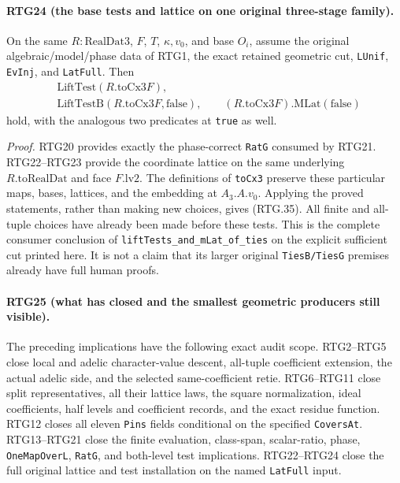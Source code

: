 \paragraph{RTG24 (the base tests and lattice on one original three-stage family).}
\label{claim:RTG24}
On the same $R:\mathrm{RealDat3}$, $F$, $T$, $\kappa,v_0$, and
base $O_i$, assume the original algebraic/model/phase data of RTG1,
the exact retained geometric cut, \texttt{LUnif}, \texttt{EvInj}, and
\texttt{LatFull}.  Then
\[
 \begin{split}
 &\mathrm{LiftTest}(R.\mathrm{toCx3}F),\\
 &\mathrm{LiftTestB}(R.\mathrm{toCx3}F,\mathrm{false}),\qquad
   (R.\mathrm{toCx3}F).\mathrm{MLat}(\mathrm{false})
 \end{split}                                                  \tag{RTG.35}
\]
hold, with the analogous two predicates at \texttt{true} as well.

\emph{Proof.}
RTG20 provides exactly the phase-correct \texttt{RatG} consumed by
RTG21.  RTG22--RTG23 provide the coordinate lattice on the same
underlying $R.\mathrm{toRealDat}$ and face $F.\mathrm{lv2}$.
The definitions of \texttt{toCx3} preserve these particular maps,
bases, lattices, and the embedding at $A_3.A.v_0$.  Applying the proved
statements, rather than making new choices, gives (RTG.35).
All finite and all-tuple choices have already been made before these
tests.  This is the complete consumer conclusion of
\texttt{liftTests\_\allowbreak and\_\allowbreak mLat\_\allowbreak of\_\allowbreak ties} on the explicit sufficient cut
printed here.  It is not a claim that its larger original
\texttt{TiesB/TiesG} premises already have full human proofs.

\paragraph{RTG25 (what has closed and the smallest geometric producers still visible).}
\label{claim:RTG25}
The preceding implications have the following exact audit scope.
RTG2--RTG5 close local and adelic character-value descent, all-tuple coefficient
extension, the actual adelic side, and the selected same-coefficient
retie.  RTG6--RTG11 close split representatives, all their lattice laws,
the square normalization, ideal coefficients, half levels and coefficient
records, and the exact residue function.  RTG12 closes all eleven
\texttt{Pins} fields conditional on the specified \texttt{CoversAt}.
RTG13--RTG21 close the finite evaluation, class-span, scalar-ratio,
phase, \texttt{OneMapOverL}, \texttt{RatG}, and both-level test
implications.  RTG22--RTG24 close the full original lattice and test
installation on the named \texttt{LatFull} input.

